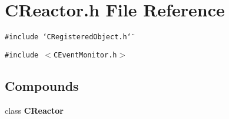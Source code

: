 \section{CReactor.h File Reference}
\label{CReactor_8h}
{\tt \#include \char`\"{}CRegistered\-Object.h\char`\"{}}\par
{\tt \#include $<$CEvent\-Monitor.h$>$}\par
\subsection*{Compounds}
\begin{CompactItemize}
\item 
class {\bf CReactor}
\end{CompactItemize}
